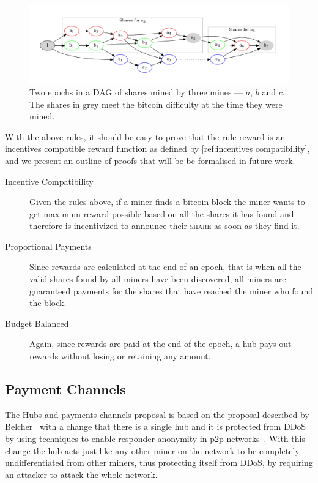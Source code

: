 \documentclass{article}
\begin{document}
\begin{figure}[h]
  \begin{center}
    \includegraphics[width=1.0\textwidth]{shares-dag}
    \caption{Two epochs in a DAG of shares mined by three mines ---
      $a$, $b$ and $c$. The shares in grey meet the bitcoin difficulty
      at the time they were mined.}\label{fig:shares-dag}
  \end{center}
\end{figure}

With the above rules, it should be easy to prove that the rule reward
is an incentives compatible reward function as defined by
[ref:incentives compatibility], and we present an outline of proofs
that will be be formalised in future work.

\begin{description}
  \item [Incentive Compatibility] Given the rules above, if a miner
    finds a bitcoin block the miner wants to get maximum reward
    possible based on all the shares it has found and therefore is
    incentivized to announce their \textsc{share} as soon as they find
    it.
  \item [Proportional Payments] Since rewards are calculated at the
    end of an epoch, that is when all the valid shares found by all
    miners have been discovered, all miners are guaranteed payments
    for the shares that have reached the miner who found the block.
  \item [Budget Balanced] Again, since rewards are paid at the end of
    the epoch, a hub pays out rewards without losing or retaining any
    amount.
\end{description}


\subsection{Payment Channels}

The Hubs and payments channels proposal is based on the proposal
described by Belcher~\cite{channels-for-rewards} with a change that
there is a single hub and it is protected from DDoS by using
techniques to enable responder anonymity in p2p
networks~\cite{responder-anonymity:file-sharing}. With this change the
hub acts just like any other miner on the network to be completely
undifferentiated from other miners, thus protecting itself from DDoS,
by requiring an attacker to attack the whole network.
\end{document}
